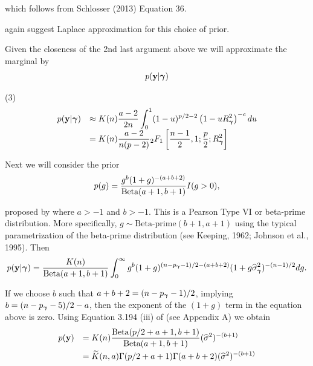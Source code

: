 \documentclass{article}[12pt]
\begin{document}
\noindent which follows from Schlosser (2013) Equation 36.

\cite{Liang2008} again suggest Laplace approximation 
for this choice of prior. 

Given the closeness of the 2nd last argument above
we will approximate the marginal by
$$
\begin{array}{rl}
p(\vy|\vgamma) 

\end{array} 
$$ 

(3)
$$
\begin{array}{rl}
p({\bf y}|{\boldsymbol \gamma}) 
& \displaystyle \approx K(n) \frac{a - 2}{2n}  \int_0^1 
(1 - u)^{p/2 - 2} \left(  1 - u R_{\boldsymbol \gamma}^2\right)^{-c} du
\\
& \displaystyle = K(n) \frac{a - 2}{n(p - 2)} {}_2 F_1\left[
\frac{n-1}{2}, 1; \frac{p}{2}; R_{\boldsymbol \gamma}^2
\right]
\end{array} 
$$ 




Next we will consider the prior 
\begin{equation}\label{eq:betaPrime}
\displaystyle p(g) = \frac{g^{b}(1 + g)^{-(a+b+2)}}{\mbox{Beta}(a+1,b+1)} I(g>0),
\end{equation}

\noindent proposed by \cite{Maruyama2011} where $a>-1$ and $b>-1$. 
This is a Pearson Type VI or beta-prime distribution. More specifically, 
$g\sim \mbox{Beta-prime}(b+1,a+1)$ using the typical parametrization of 
the beta-prime distribution (see Keeping, 1962; Johnson et al., 1995).
Then
$$
\displaystyle p({\bf y}|{\boldsymbol \gamma}) 
=
\frac{K(n)}{\mbox{Beta}(a+1,b+1)}
\int_0^\infty             
g^{b}(1 + g)^{(n - p_{\boldsymbol \gamma} - 1)/2 - (a + b + 2)}  (1 + g \widehat{\sigma}_{\boldsymbol \gamma}^2 )^{-(n-1)/2}  
dg.
$$

\noindent If we choose $b$ such that
$a+b+2 = (n - p_{\boldsymbol \gamma} - 1)/2$, implying
$b = (n - p_{\boldsymbol \gamma} - 5)/2 - a$, then the exponent of the $(1 + g)$ term in the equation above is zero.
Using Equation 3.194 (iii) of \cite{Gradshteyn2007}
(see Appendix A) we obtain
\begin{equation}\label{eq:marginalLikelihood}
\begin{array}{rl}
\displaystyle p({\bf y}) 
& \displaystyle 
=  K(n)
\frac{\mbox{Beta}(p/2 + a + 1,b + 1)}{\mbox{Beta}(a+1,b+1)} (\widehat{\sigma}^2)^{-(b + 1)}
\\ [2ex]
& \displaystyle = \widetilde{K}(n,a)

\Gamma(p/2 + a + 1)\Gamma(a + b + 2)
(\widehat{\sigma}^2)^{-(b + 1)}
\end{array}
\end{equation}
\end{document}
